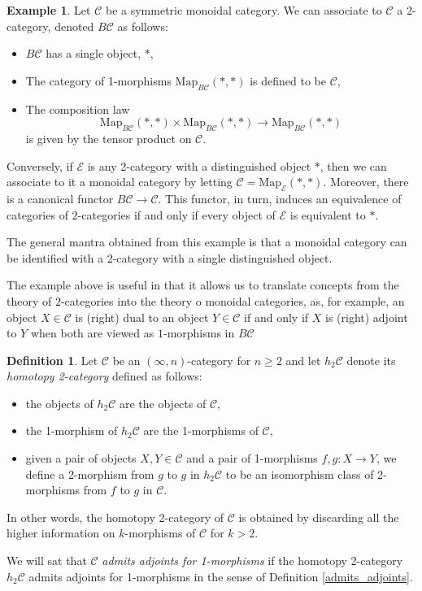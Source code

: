 \documentclass[a4paper,11pt]{article}
\newcommand{\ccal}{\mathcal{C}}
\newcommand{\ecal}{\mathcal{E}}
\theoremstyle{plain}
\theoremstyle{definition}
\newtheorem{defi}[thm]{Definition}
\newtheorem{ej}[thm]{Example}
\theoremstyle{remark}
\begin{document}
\begin{ej}
Let $\ccal$ be a symmetric monoidal category. We can associate to $\ccal$ a 2-category, denoted $B \ccal$ as follows: 
\begin{itemize}
    \item $B \ccal$ has a single object, $*$,
    \item The category of 1-morphisms $\text{Map}_{B \ccal}(*,*)$ is defined to be $\ccal$, 
    \item The composition law
    $$\text{Map}_{B \ccal}(*,*) \times \text{Map}_{B \ccal}(*, *) \to \text{Map}_{B \ccal}(*,*)$$
    is given by the tensor product on $\ccal$.
\end{itemize}

Conversely, if $\ecal$ is any 2-category with a distinguished object $*$, then we can associate to it a monoidal category by letting $\ccal = \text{Map}_{\ecal}(*,*)$. Moreover, there is a canonical functor $B \ccal \to \ccal$. This functor, in turn, induces an equivalence of categories of $2$-categories if and only if every object of $\ecal$ is equivalent to $*$.

The general mantra obtained from this example is that a monoidal category can be identified with a 2-category with a single distinguished object. 
\end{ej}


The example above is useful in that it allows us to translate concepts from the theory of $2$-categories into the theory o monoidal categories, as, for example, an object $X \in \ccal$ is (right) dual to an object $Y \in \ccal$ if and only if $X$ is (right) adjoint to $Y$ when both are viewed as $1$-morphisms in $B \ccal$






\begin{defi}
\label{has_adjoints}
Let $\ccal$ be an $(\infty, n)$-category for $n \geq 2$ and let $h_2 \ccal$ denote its \textit{homotopy 2-category} defined as follows: 
\begin{itemize}
    \item the objects of $h_2 \ccal$ are the objects of $\ccal$, 
    \item the 1-morphism of $h_2 \ccal$ are the 1-morphisms of $\ccal$, 
    \item given a pair of objects $X, Y \in \ccal$ and a pair of 1-morphisms $f, g \colon X \to Y$, we define a 2-morphism from $g$ to $g$ in $h_2 \ccal$ to be an isomorphism class of 2-morphisms from $f$ to $g$ in $\ccal$. 
\end{itemize}
In other words, the homotopy 2-category of $\ccal$ is obtained by discarding all the higher information on $k$-morphisms of $\ccal$ for $k>2$. 

We will sat that $\ccal$ \textit{admits adjoints for 1-morphisms} if the homotopy 2-category $h_2 \ccal$ admits adjoints for 1-morphisms in the sense of Definition \ref{admits_adjoints}. 
\end{defi}
\end{document}
